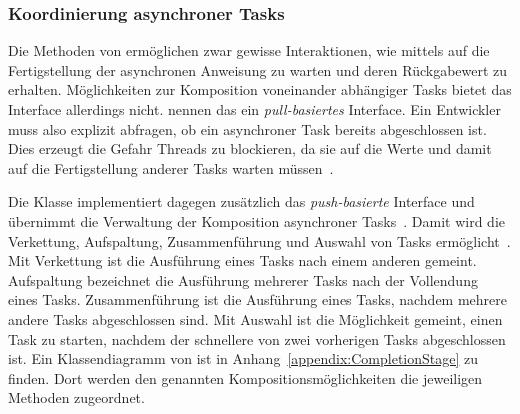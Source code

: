 \subsubsection{Koordinierung asynchroner Tasks}\label{sec:CompletableFuture}
Die Methoden von  ermöglichen zwar gewisse Interaktionen, wie mittels  auf die Fertigstellung der asynchronen \gls{Anweisung} zu warten und deren Rückgabewert zu erhalten. Möglichkeiten zur Komposition voneinander abhängiger Tasks bietet das Interface allerdings nicht. \textcite[S.~240]{Hettel2016} nennen das ein \emph{pull-basiertes} Interface. Ein Entwickler muss also explizit abfragen, ob ein asynchroner Task bereits abgeschlossen ist. Dies erzeugt die Gefahr Threads zu blockieren, da sie auf die Werte und damit auf die Fertigstellung anderer Tasks warten müssen~\cite[S.~239]{Hettel2016}.

Die Klasse  implementiert dagegen zusätzlich das \emph{push-basierte} Interface  und übernimmt die Verwaltung der Komposition asynchroner Tasks~\cite[S.~240~ff.]{Hettel2016}. Damit wird die Verkettung, Aufspaltung, Zusammenführung und Auswahl von Tasks ermöglicht~\cite[S.~250~ff.]{Hettel2016}. Mit Verkettung ist die Ausführung eines Tasks nach einem anderen gemeint. Aufspaltung bezeichnet die Ausführung mehrerer Tasks nach der Vollendung eines Tasks. Zusammenführung ist die Ausführung eines Tasks, nachdem mehrere andere Tasks abgeschlossen sind. Mit Auswahl ist die Möglichkeit gemeint, einen Task zu starten, nachdem der schnellere von zwei vorherigen Tasks abgeschlossen ist. Ein Klassendiagramm von  ist in Anhang~\ref{appendix:CompletionStage} zu finden. Dort werden den genannten Kompositionsmöglichkeiten die jeweiligen Methoden zugeordnet.